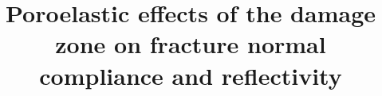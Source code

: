 \documentclass[draft,jgrga]{agutexSI2019}
\begin{document}
%
%



\title{Poroelastic effects of the damage zone on fracture normal compliance and reflectivity}
%
%

%
%









%
%

%
\end{document}
